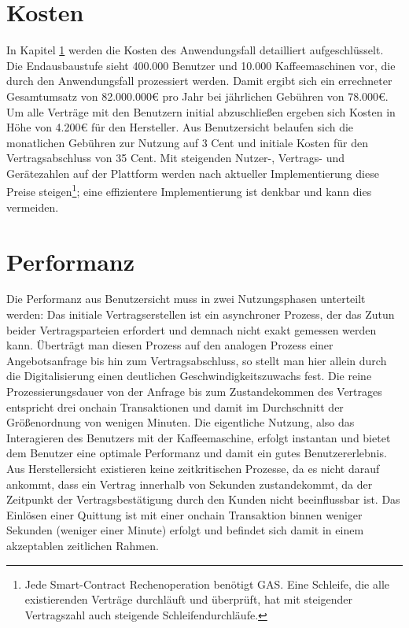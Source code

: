 \section{Kosten}
\label{sec:results:costs}
In Kapitel \ref{sec:results:costs} werden die Kosten des Anwendungsfall detailliert aufgeschlüsselt. Die Endausbaustufe sieht 400.000 Benutzer und 10.000 Kaffeemaschinen vor, die durch den Anwendungsfall prozessiert werden. Damit ergibt sich ein errechneter Gesamtumsatz von 82.000.000€ pro Jahr bei jährlichen Gebühren von 78.000€. Um alle Verträge mit den Benutzern initial abzuschließen ergeben sich Kosten in Höhe von 4.200€ für den Hersteller. Aus Benutzersicht belaufen sich die monatlichen Gebühren zur Nutzung auf 3 Cent und initiale Kosten für den Vertragsabschluss von 35 Cent. Mit steigenden Nutzer-, Vertrags- und Gerätezahlen auf der Plattform werden nach aktueller Implementierung diese Preise steigen\footnote{Jede Smart-Contract Rechenoperation benötigt GAS. Eine Schleife, die alle existierenden Verträge durchläuft und überprüft, hat mit steigender Vertragszahl auch steigende Schleifendurchläufe.}; eine effizientere Implementierung ist denkbar und kann dies vermeiden.

\section{Performanz}
\label{sec:results:performance}
Die Performanz aus Benutzersicht muss in zwei Nutzungsphasen unterteilt werden: Das initiale Vertragserstellen ist ein asynchroner Prozess, der das Zutun beider Vertragsparteien erfordert und demnach nicht exakt gemessen werden kann. Überträgt man diesen Prozess auf den analogen Prozess einer Angebotsanfrage bis hin zum Vertragsabschluss, so stellt man hier allein durch die Digitalisierung einen deutlichen Geschwindigkeitszuwachs fest. Die reine Prozessierungsdauer von der Anfrage bis zum Zustandekommen des Vertrages entspricht drei onchain Transaktionen und damit im Durchschnitt der Größenordnung von wenigen Minuten. Die eigentliche Nutzung, also das Interagieren des Benutzers mit der Kaffeemaschine, erfolgt instantan und bietet dem Benutzer eine optimale Performanz und damit ein gutes Benutzererlebnis.\\
Aus Herstellersicht existieren keine zeitkritischen Prozesse, da es nicht darauf ankommt, dass ein Vertrag innerhalb von Sekunden zustandekommt, da der Zeitpunkt der Vertragsbestätigung durch den Kunden nicht beeinflussbar ist. Das Einlösen einer Quittung ist mit einer onchain Transaktion binnen weniger Sekunden (weniger einer Minute) erfolgt und befindet sich damit in einem akzeptablen zeitlichen Rahmen.


